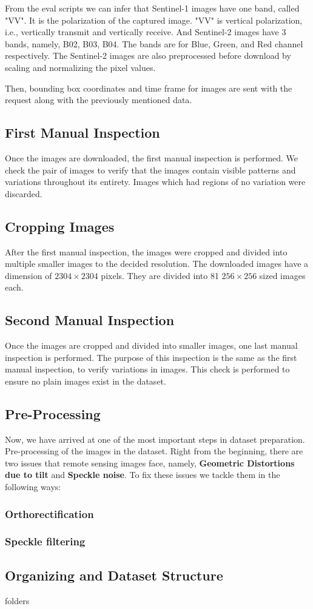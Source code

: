 From the eval scripts we can infer that Sentinel-1 images have one band, called "VV". It is the polarization of the captured image. "VV" is vertical polarization, i.e.,  vertically transmit and vertically receive. And Sentinel-2 images have 3 bands, namely, B02, B03, B04. The bands are for Blue, Green, and Red channel respectively. The Sentinel-2 images are also preprocessed before download by scaling and normalizing the pixel values. 

Then, bounding box coordinates and time frame for images are sent with the request along with the previously mentioned data.

\subsection{First Manual Inspection}

Once the images are downloaded, the first manual inspection is performed. We check the pair of images to verify that the images contain visible patterns and variations throughout its entirety. Images which had regions of no variation were discarded.

\subsection{Cropping Images}

After the first manual inspection, the images were cropped and divided into multiple smaller images to the decided resolution. The downloaded images have a dimension of $2304\times2304$ pixels. They are divided into 81 $256\times256$ sized images each.

\subsection{Second Manual Inspection}

Once the images are cropped and divided into smaller images, one last manual inspection is performed. The purpose of this inspection is the same as the first manual inspection, to verify variations in images. This check is performed to ensure no plain images exist in the dataset.

\subsection{Pre-Processing}

Now, we have arrived at one of the most important steps in dataset preparation. Pre-processing of the images in the dataset. Right from the beginning, there are two issues that remote sensing images face, namely, \textbf{Geometric Distortions due to tilt} and \textbf{Speckle noise}. To fix these issues we tackle them in the following ways:

\subsubsection{Orthorectification}

\subsubsection{Speckle filtering}

\subsection{Organizing and Dataset Structure}

folders